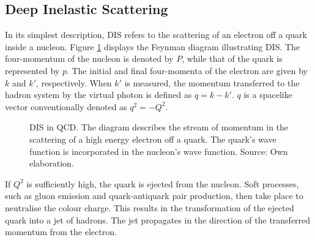 \subsection{Deep Inelastic Scattering}
\label{ssec::dis}
    In its simplest description, DIS refers to the scattering of an electron off a quark inside a nucleon.
    Figure \ref{fig::dis_diagram} displays the Feynman diagram illustrating DIS.
    The four-momentum of the nucleon is denoted by $P$, while that of the quark is represented by $p$.
    The initial and final four-momenta of the electron are given by $k$ and $k'$, respectively.
    When $k'$ is measured, the momentum transferred to the hadron system by the virtual photon is defined as $q = k - k'$.
    $q$ is a spacelike vector conventionally denoted as $q^2 = -Q^2$.

    \begin{figure}[h!]
        \centering{}
        \caption[DIS in QCD.]{DIS in QCD. The diagram describes the stream of momentum in the scattering of a high energy electron off a quark. The quark's wave function is incorporated in the nucleon's wave function. Source: Own elaboration.}
        \label{fig::dis_diagram}
    \end{figure}

    If $Q^2$ is sufficiently high, the quark is ejected from the nucleon.
    Soft processes, such as gluon emission and quark-antiquark pair production, then take place to neutralise the colour charge.
    This results in the transformation of the ejected quark into a jet of hadrons.
    The jet propagates in the direction of the transferred momentum from the electron.

    
    
    
